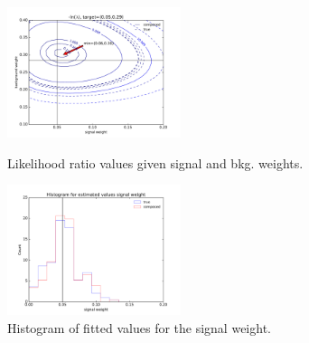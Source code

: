 \documentclass[a4paper]{jpconf}
\begin{document}
\begin{figure}[h]
\begin{minipage}{11pc}
\includegraphics[width=12pc]{comp_train_mlp_multilikelihood.pdf}
\caption{\label{fig:2dfit} Likelihood ratio values given signal and bkg. weights.} %
\end{minipage}\hspace{2pc}%
\begin{minipage}{11pc}
\includegraphics[width=12pc]{c1c2_train_mlp_c1_hist.pdf}
\caption{\label{fig:hist1} Histogram of fitted values for the signal weight.}
\end{minipage}\hspace{2pc}
\begin{minipage}{11pc}

\end{minipage}
\end{figure}
\end{document}
